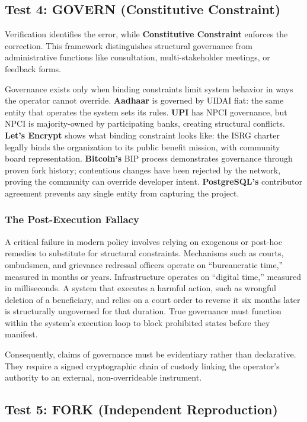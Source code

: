 \documentclass{article}
\begin{document}
\subsection{Test 4: GOVERN (Constitutive Constraint)}

Verification identifies the error, while \textbf{Constitutive Constraint} enforces the correction. This framework distinguishes structural governance from administrative functions like consultation, multi-stakeholder meetings, or feedback forms.

Governance exists only when binding constraints limit system behavior in ways the operator cannot override. \textbf{Aadhaar} is governed by UIDAI fiat: the same entity that operates the system sets its rules. \textbf{UPI} has NPCI governance, but NPCI is majority-owned by participating banks, creating structural conflicts. \textbf{Let's Encrypt} shows what binding constraint looks like: the ISRG charter legally binds the organization to its public benefit mission, with community board representation. \textbf{Bitcoin's} BIP process demonstrates governance through proven fork history; contentious changes have been rejected by the network, proving the community can override developer intent. \textbf{PostgreSQL's} contributor agreement prevents any single entity from capturing the project.

\subsubsection{The Post-Execution Fallacy}
A critical failure in modern policy involves relying on exogenous or post-hoc remedies to substitute for structural constraints. Mechanisms such as courts, ombudsmen, and grievance redressal officers operate on ``bureaucratic time,'' measured in months or years. Infrastructure operates on ``digital time,'' measured in milliseconds. A system that executes a harmful action, such as wrongful deletion of a beneficiary, and relies on a court order to reverse it six months later is structurally ungoverned for that duration. True governance must function within the system's execution loop to block prohibited states before they manifest.

Consequently, claims of governance must be evidentiary rather than declarative. They require a signed cryptographic chain of custody linking the operator's authority to an external, non-overrideable instrument.

\subsection{Test 5: FORK (Independent Reproduction)}
\end{document}
